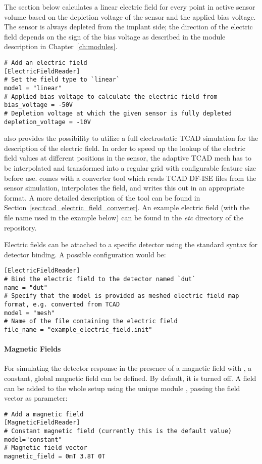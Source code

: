 The section below calculates a linear electric field for every point in active sensor volume based on the depletion voltage of the sensor and the applied bias voltage.
The sensor is always depleted from the implant side; the direction of the electric field depends on the sign of the bias voltage as described in the module description in Chapter~\ref{ch:modules}.
\begin{verbatim}
# Add an electric field
[ElectricFieldReader]
# Set the field type to `linear`
model = "linear"
# Applied bias voltage to calculate the electric field from
bias_voltage = -50V
# Depletion voltage at which the given sensor is fully depleted
depletion_voltage = -10V
\end{verbatim}

\apsq also provides the possibility to utilize a full electrostatic TCAD simulation for the description of the electric field.
In order to speed up the lookup of the electric field values at different positions in the sensor, the adaptive TCAD mesh has to be interpolated and transformed into a regular grid with configurable feature size before use.
\apsq comes with a converter tool which reads TCAD DF-ISE files from the sensor simulation, interpolates the field, and writes this out in an appropriate format.
A more detailed description of the tool can be found in Section~\ref{sec:tcad_electric_field_converter}.
An example electric field (with the file name used in the example below) can be found in the \textit{etc} directory of the \apsq repository.

Electric fields can be attached to a specific detector using the standard syntax for detector binding.
A possible configuration would be:
\begin{verbatim}
[ElectricFieldReader]
# Bind the electric field to the detector named `dut`
name = "dut"
# Specify that the model is provided as meshed electric field map format, e.g. converted from TCAD
model = "mesh"
# Name of the file containing the electric field
file_name = "example_electric_field.init"
\end{verbatim}

\paragraph{Magnetic Fields}
\label{sec:module_magnetic_field}

For simulating the detector response in the presence of a magnetic field with \apsq, a constant, global magnetic field can be defined. By default, it is turned off. A field can be added to the whole setup using the unique module , passing the field vector as parameter:
\begin{verbatim}
# Add a magnetic field
[MagneticFieldReader]
# Constant magnetic field (currently this is the default value)
model="constant"
# Magnetic field vector
magnetic_field = 0mT 3.8T 0T
\end{verbatim}

